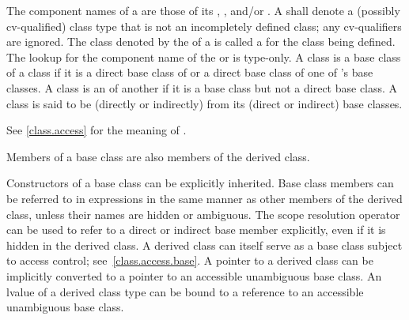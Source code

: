 \pnum
{}%
The component names of a  are those of its
,
, and/or
.
%
A  shall denote
a (possibly cv-qualified) class type that is not
an incompletely defined class;
any cv-qualifiers are ignored.
The class denoted by the  of
a  is called a
for the class being defined.
%
%
The lookup for the component name of
the  or 
is type-only.
A class  is a
base class of a class  if it is a direct base class of
 or a direct base class of one of 's base classes.
A class is an  of another if it is a base
class but not a direct base class. A class is said to be (directly or
indirectly)  from its (direct or indirect) base
classes.
\begin{note}
See \ref{class.access} for the meaning of
.
\end{note}
%
Members of a base class are also members of the derived class.
\begin{note}
Constructors of a base class can be explicitly inherited.
Base class members can be referred to in
expressions in the same manner as other members of the derived class,
unless their names are hidden or ambiguous.
%
The scope resolution operator \tcode{::} can be used
to refer to a direct or indirect base member explicitly,
even if it is hidden in the derived class.
A derived class can itself serve as a base class subject to access
control; see~\ref{class.access.base}. A pointer to a derived class can be
implicitly converted to a pointer to an accessible unambiguous base
class. An lvalue of a derived class type can be bound
to a reference to an accessible unambiguous base
class.
\end{note}

